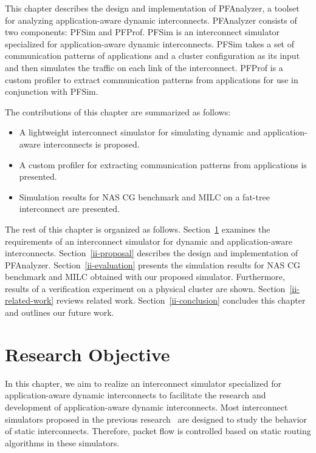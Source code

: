 This chapter describes the design and implementation of PFAnalyzer, a
toolset for analyzing application-aware dynamic interconnects.
PFAnalyzer consists of two components: PFSim and PFProf. PFSim is an
interconnect simulator specialized for application-aware dynamic
interconnects. PFSim takes a set of communication patterns of
applications and a cluster configuration as its input and then simulates
the traffic on each link of the interconnect. PFProf is a custom
profiler to extract communication patterns from applications for use in
conjunction with PFSim.

The contributions of this chapter are summarized as follows:

\begin{itemize}
\item
  A lightweight interconnect simulator for simulating dynamic and
  application-aware interconnects is proposed.
\item
  A custom profiler for extracting communication patterns from
  applications is presented.
\item
  Simulation results for NAS CG benchmark and MILC on a fat-tree
  interconnect are presented.
\end{itemize}

The rest of this chapter is organized as follows.
Section~\ref{ii-objective} examines the requirements of an
interconnect simulator for dynamic and application-aware interconnects.
Section~\ref{ii-proposal}
describes the design and implementation of PFAnalyzer.
Section~\ref{ii-evaluation} presents the simulation results for NAS CG
benchmark and MILC obtained with our proposed simulator. Furthermore,
results of a verification experiment on a physical cluster are shown.
Section~\ref{ii-related-work} reviews related work.
Section~\ref{ii-conclusion} concludes this chapter and outlines our future
work.

\section{Research Objective}\label{ii-objective}

In this chapter, we aim to realize an interconnect simulator specialized
for application-aware dynamic interconnects to facilitate the research
and development of application-aware dynamic interconnects. Most
interconnect simulators proposed in the previous
research~\autocites{Schneider2009}{Tikir2009}{Hoefler2010}{Jo2015} are
designed to study the behavior of static interconnects. Therefore,
packet flow is controlled based on static routing algorithms in these
simulators.

